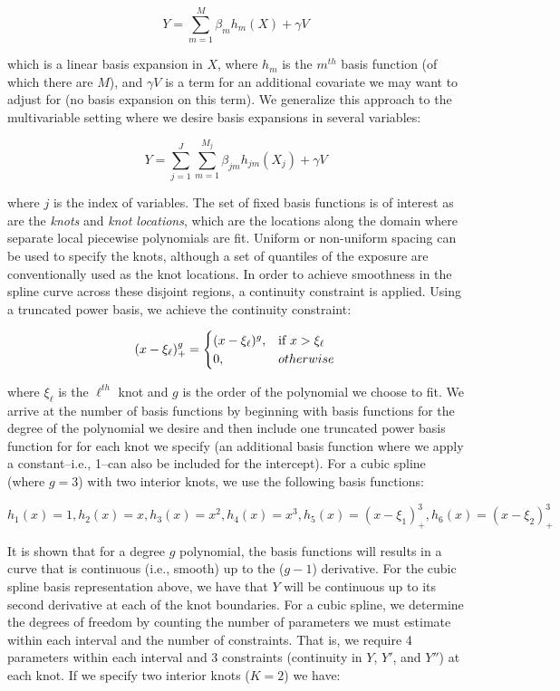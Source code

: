 \documentclass{article}
\begin{document}
$$Y=\sum_{m=1}^{M}{\beta_mh_m(X)+\gamma V}$$

\noindent which is a linear basis expansion in $X$, where $h_m$ is the $m^{th}$ basis function (of which there are $M$), and $\gamma V$ is a term for an additional covariate we may want to adjust for (no basis expansion on this term).\supercite{hastie_elements_2009} We generalize this approach to the multivariable setting where we desire basis expansions in several variables:

$$Y=\sum_{j=1}^{J}\sum_{m=1}^{M_j}{\beta_{jm}{h_{jm}}(X_j)+\gamma V}$$

\noindent where $j$ is the index of variables. The set of fixed basis functions is of interest as are the \textit{knots} and \textit{knot locations}, which are the locations along the domain where separate local piecewise polynomials are fit. Uniform or non-uniform spacing can be used to specify the knots, although a set of quantiles of the exposure are conventionally used as the knot locations. \supercite{james_introduction_2013} In order to achieve smoothness in the spline curve across these disjoint regions, a continuity constraint is applied. Using a truncated power basis, we achieve the continuity constraint:

\begin{equation}
(x-\xi_\ell)^{g}_{+}=\begin{cases}
(x-\xi_\ell)^{g}, & \text{if  } x > \xi_\ell \\
0, & otherwise  \notag \\
\end{cases}
\end{equation}

\noindent where $\xi_{\ell}$ is the $\ell^{th}$ knot and $g$ is the order of the polynomial we choose to fit. We arrive at the number of basis functions by beginning with basis functions for the degree of the polynomial we desire and then include one truncated power basis function for for each knot we specify (an additional basis function where we apply a constant--i.e., 1--can also be included for the intercept).\supercite{james_introduction_2013} For a cubic spline (where $g=3$) with two interior knots, we use the following basis functions:

$$h_1(x)=1,h_2(x)=x, h_3(x)=x^2, h_4(x)=x^3,h_5(x)=(x-\xi_1)^{3}_{+},h_6(x)=(x-\xi_2)^{3}_{+}$$

\noindent It is shown that for a degree $g$ polynomial, the basis functions will results in a curve that is continuous (i.e., smooth) up to the ($g-1$) derivative. \supercite{james_introduction_2013} For the cubic spline basis representation above, we have that $Y$ will be continuous up to its second derivative at each of the knot boundaries. For a cubic spline, we determine the degrees of freedom by counting the number of parameters we must estimate within each interval and the number of constraints. That is, we require 4 parameters within each interval and 3 constraints (continuity in $Y$, $Y'$, and $Y''$) at each knot. If we specify two interior knots ($K=2$) we have:
\end{document}
